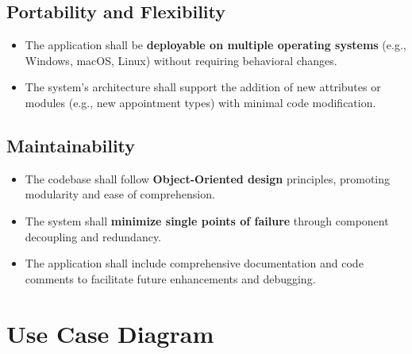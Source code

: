 \subsection{Portability and Flexibility}
\begin{itemize}
	\item The application shall be \textbf{deployable on multiple operating systems} (e.g., Windows, macOS, Linux) without requiring behavioral changes.
	\item The system’s architecture shall support the addition of new attributes or modules (e.g., new appointment types) with minimal code modification.
\end{itemize}

\subsection{Maintainability}
\begin{itemize}
	\item The codebase shall follow \textbf{Object-Oriented design} principles, promoting modularity and ease of comprehension.
	\item The system shall \textbf{minimize single points of failure} through component decoupling and redundancy.
	\item The application shall include comprehensive documentation and code comments to facilitate future enhancements and debugging.
\end{itemize}

\section{Use Case Diagram}

